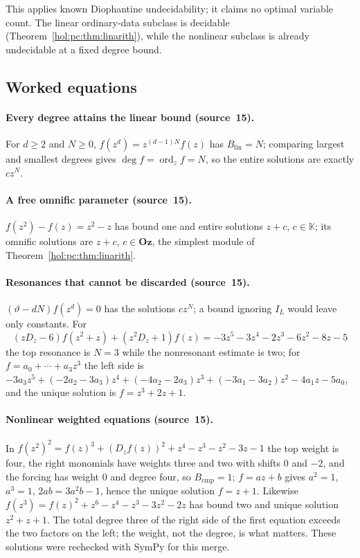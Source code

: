 \documentclass[11pt]{article}
\numberwithin{equation}{section}
\theoremstyle{definition}
\theoremstyle{remark}
\newcommand{\KK}{\mathbb K}
\newcommand{\Oz}{\mathbf{Oz}}
\begin{document}
This applies known Diophantine undecidability; it claims no optimal variable
count. The linear ordinary-data subclass is decidable
(Theorem~\ref{hol:pc:thm:linarith}), while the nonlinear subclass is already
undecidable at a fixed degree bound.

\subsection{Worked equations}\label{hol:pc:sub:examples}

\paragraph{Every degree attains the linear bound (source~15).}
For $d\ge2$ and $N\ge0$, $f(z^d)=z^{(d-1)N}f(z)$ has $B_{\mathrm{lin}}=N$;
comparing largest and smallest degrees gives $\deg f=\operatorname{ord}_zf=N$,
so the entire solutions are exactly $cz^N$.

\paragraph{A free omnific parameter (source~15).}
$f(z^2)-f(z)=z^2-z$ has bound one and entire solutions $z+c$, $c\in\KK$; its
omnific solutions are $z+c$, $c\in\Oz$, the simplest module of
Theorem~\ref{hol:pc:thm:linarith}.

\paragraph{Resonances that cannot be discarded (source~15).}
$(\vartheta-dN)f(z^d)=0$ has the solutions $cz^N$; a bound ignoring $I_L$ would
leave only constants. For
\[
 (zD_z-6)f(z^2+z)+(z^2D_z+1)f(z)=-3z^5-3z^4-2z^3-6z^2-8z-5
\]
the top resonance is $N=3$ while the nonresonant estimate is two; for
$f=a_0+\cdots+a_3z^3$ the left side is $-3a_3z^5+(-2a_2-3a_3)z^4+(-4a_2-2a_3)z^3
+(-3a_1-3a_2)z^2-4a_1z-5a_0$, and the unique solution is $f=z^3+2z+1$.

\paragraph{Nonlinear weighted equations (source~15).}
In $f(z^2)^2=f(z)^3+(D_zf(z))^2+z^4-z^3-z^2-3z-1$ the top weight is four, the
right monomials have weights three and two with shifts $0$ and $-2$, and the
forcing has weight $0$ and degree four, so $B_{\mathrm{cmp}}=1$; $f=az+b$ gives
$a^2=1$, $a^3=1$, $2ab=3a^2b-1$, hence the unique solution $f=z+1$. Likewise
$f(z^3)=f(z)^2+z^6-z^4-z^3-3z^2-2z$ has bound two and unique solution
$z^2+z+1$. The total degree three of the right side of the first equation
exceeds the two factors on the left; the weight, not the degree, is what
matters. These solutions were rechecked with SymPy for this merge.
\end{document}
